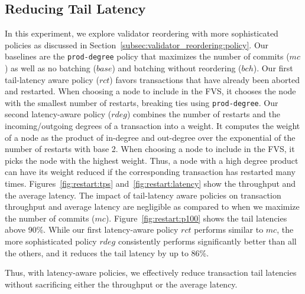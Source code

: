 \subsection{Reducing Tail Latency}
\label{subsec:experiment:policy}

In this experiment, we explore validator reordering with more sophisticated policies as discussed in Section~\ref{subsec:validator_reordering:policy}.
Our baselines are the \texttt{prod-degree} policy that maximizes the number of commits ($mc$) as well as no batching ($base$) and batching without reordering ($bch$). 
Our first tail-latency aware policy ($rct$) favors transactions that have already been aborted and restarted. When choosing a node to include in the FVS, it chooses the node with the smallest number of restarts, breaking ties using \texttt{prod-degree}.
Our second latency-aware policy ($rdeg$) combines the number of restarts and the incoming/outgoing degrees of a transaction into a weight. It computes the weight of a node as
the product of in-degree and out-degree over the exponential of the number of
restarts with base 2. When choosing a node to include in the FVS, it picks the node with the highest weight. Thus, a node with a high degree product can have its weight reduced if the corresponding transaction has restarted many times.
Figures~\ref{fig:restart:tps} and~\ref{fig:restart:latency} show the throughput
and the average latency. The impact of tail-latency aware policies on transaction throughput and average latency are negligible as compared to when we maximize the number of commits ($mc$).
Figure~\ref{fig:restart:p100} shows the 
tail latencies above 90\%. 
While our first latency-aware policy $rct$ performs similar to $mc$, the more sophisticated policy $rdeg$ consistently performs significantly better than all the others, and it reduces the tail latency by up to 86\%.

Thus, with latency-aware policies, we effectively reduce transaction tail latencies without sacrificing either the throughput or the average latency.

